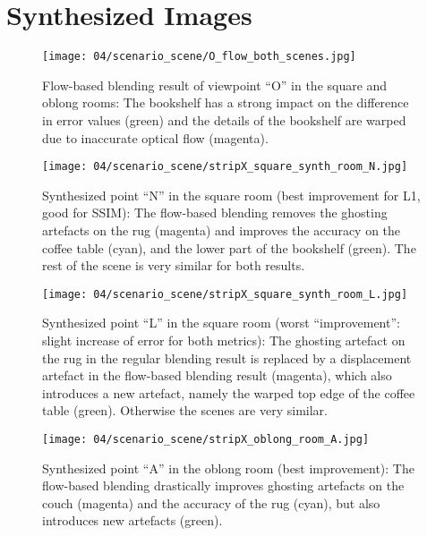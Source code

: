 \chapter{Synthesized Images}\label{imgs}

\begin{figure}
		\centering
    \texttt{[image: 04/scenario\_scene/O\_flow\_both\_scenes.jpg]}
		\caption[Flow-based blending results of ``O'']{Flow-based blending result of viewpoint ``O'' in the square and oblong rooms: The bookshelf has a strong impact on the difference in error values (green) and the details of the bookshelf are warped due to inaccurate optical flow (magenta).}
		\label{fig:scene_O_flow}
\end{figure}

\begin{figure}
  \centering
  \texttt{[image: 04/scenario\_scene/stripX\_square\_synth\_room\_N.jpg]}
  \caption[Viewpoint ``N'' in the square room]{Synthesized point ``N'' in the square room (best improvement for L1, good for SSIM): The flow-based blending removes the ghosting artefacts on the rug (magenta) and improves the accuracy on the coffee table (cyan), and the lower part of the bookshelf (green). The rest of the scene is very similar for both results.}
  \label{fig:scene_square_N}
\end{figure}

\begin{figure}
  \centering
  \texttt{[image: 04/scenario\_scene/stripX\_square\_synth\_room\_L.jpg]}
  \caption[Viewpoint ``L'' in the square room]{Synthesized point ``L'' in the square room (worst ``improvement'': slight increase of error for both metrics): The ghosting artefact on the rug in the regular blending result is replaced by a displacement artefact in the flow-based blending result (magenta), which also introduces a new artefact, namely the warped top edge of the coffee table (green). Otherwise the scenes are very similar.}
  \label{fig:scene_square_L}
\end{figure}

\begin{figure}
  \centering
  \texttt{[image: 04/scenario\_scene/stripX\_oblong\_room\_A.jpg]}
  \caption[Viewpoint ``A'' in the oblong room]{Synthesized point ``A'' in the oblong room (best improvement): The flow-based blending drastically improves ghosting artefacts on the couch (magenta) and the accuracy of the rug (cyan), but also introduces new artefacts (green).}
  \label{fig:scene_oblong_A}
\end{figure}

